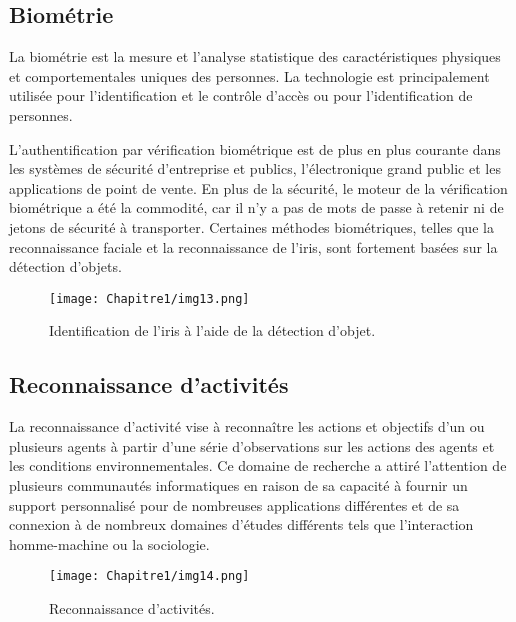      \subsection{Biométrie}
     La biométrie est la mesure et l'analyse statistique des caractéristiques physiques et comportementales uniques des personnes. La technologie est principalement utilisée pour l'identification et le contrôle d'accès ou pour l'identification de personnes.
     
     L'authentification par vérification biométrique est de plus en plus courante dans les systèmes de sécurité d'entreprise et publics, l'électronique grand public et les applications de point de vente. En plus de la sécurité, le moteur de la vérification biométrique a été la commodité, car il n'y a pas de mots de passe à retenir ni de jetons de sécurité à transporter. Certaines méthodes biométriques, telles que la reconnaissance faciale et la reconnaissance de l'iris, sont fortement basées sur la détection d'objets.
     \begin{figure}[H]
          \centering
          \texttt{[image: Chapitre1/img13.png]}
          \caption{Identification de l'iris à l'aide de la détection d'objet.}
          \label{img13}
          \end{figure}
     
     \subsection{Reconnaissance d'activités}
     La reconnaissance d'activité vise à reconnaître les actions et objectifs d'un ou plusieurs agents à partir d'une série d'observations sur les actions des agents et les conditions environnementales. Ce domaine de recherche a attiré l'attention de plusieurs communautés informatiques en raison de sa capacité à fournir un support personnalisé pour de nombreuses applications différentes et de sa connexion à de nombreux domaines d'études différents tels que l'interaction homme-machine ou la sociologie.
     \begin{figure}[H]
          \centering
          \texttt{[image: Chapitre1/img14.png]}
          \caption{Reconnaissance d'activités.}
          \label{img14}
          \end{figure}

